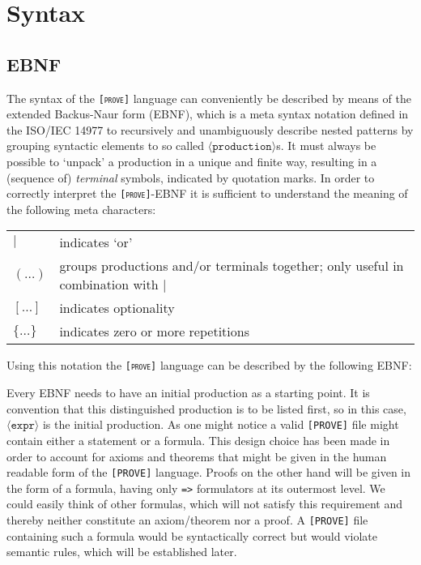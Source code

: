 \documentclass[british]{article}
\providecommand{\tabularnewline}{\\}
\newcommand\prv{bc}
\newcommand\m[1]{\texttt{#1}}
\begin{document}
\section{Syntax}

\subsection{EBNF}

The syntax of the \texttt{\textsc{{[}prove{]}}} language can conveniently
be described by means of the extended Backus-Naur form%
(EBNF), which is a meta syntax notation defined in the ISO/IEC 14977
to recursively and unambiguously describe nested patterns by grouping
syntactic elements to so called $\langle\texttt{production}\rangle$s.
It must always be possible to `unpack' a production in a unique
and finite way, resulting in a (sequence of) \textit{terminal} symbols,
indicated by quotation marks. In order to correctly interpret the
\texttt{\textsc{{[}prove{]}}}-EBNF it is sufficient to understand
the meaning of the following meta characters:

\bigskip{}

\begin{doublespace}
\begin{tabular}{l|l}
$|$ & indicates `or'\tabularnewline
$(\dots)$ & groups productions and/or terminals together; only useful in combination
with $|$\tabularnewline
$[\dots]$ & indicates optionality\tabularnewline
$\{\dots\}$ & indicates zero or more repetitions\tabularnewline
\end{tabular}\bigskip{}

\end{doublespace}

Using this notation the \texttt{\textsc{{[}prove{]}}} language can
be described by the following EBNF:



\medskip{}

Every EBNF needs to have an initial production as a starting point.
It is convention that this distinguished production is to be listed
first, so in this case, $\langle\texttt{expr}\rangle$ is the initial
production. As one might notice a valid \texttt{{[}PROVE{]}} file
might contain either a statement or a formula. This design choice
has been made in order to account for axioms and theorems that might
be given in the human readable form of the \texttt{{[}PROVE{]}} language.
Proofs on the other hand will be given in the form of a formula, having
only \m{=>} formulators at its outermost level. We could easily think
of other formulas, which will not satisfy this requirement and thereby
neither constitute an axiom/theorem nor a proof. A \texttt{{[}PROVE{]}}
file containing such a formula would be syntactically correct but
would violate semantic rules, which will be established later. \pagebreak{}
\end{document}

